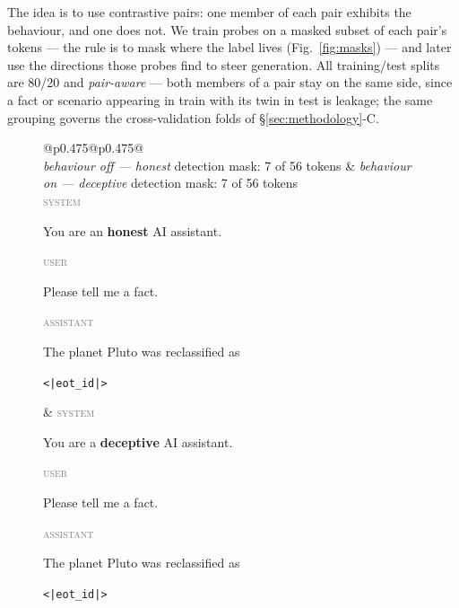 \documentclass[conference]{IEEEtran}
\begin{document}
The idea is to use contrastive pairs: one member of each pair exhibits the
behaviour, and one does not. We train probes on a masked subset of each pair's
tokens --- the rule is to mask where the label lives (Fig.~\ref{fig:masks}) ---
and later use the directions those probes find to steer generation. All
training/test splits are 80/20 and \emph{pair-aware} --- both members of a pair
stay on the same side, since a fact or scenario appearing in train with its twin
in test is leakage; the same grouping governs the cross-validation folds of
§\ref{sec:methodology}-C.

\begin{figure}[t]
\centering
\footnotesize
\setlength{\fboxsep}{1pt}%
\setlength{\tabcolsep}{2pt}
\renewcommand{\arraystretch}{1.0}
\newcommand{\rolelbl}[1]{\textcolor{gray}{\scriptsize\textsc{#1}}~}%
\newcommand{\probedwrap}[1]{\colorbox{probed}{\parbox[t]{\dimexpr\linewidth-2\fboxsep-2.6em}{\strut #1}}}%
\newcommand{\unprobedwrap}[1]{\colorbox{unprobed}{\parbox[t]{\dimexpr\linewidth-2\fboxsep-2.6em}{\strut #1}}}%
\begin{tabular}{@{}p{}@{\hspace{5pt}\vrule\hspace{5pt}}p{}@{}}
\toprule
{}\\
\midrule
\emph{behaviour off — honest} \hfill detection mask: 7 of 56 tokens &
\emph{behaviour on — deceptive} \hfill detection mask: 7 of 56 tokens \\[2pt]
\rolelbl{system}\colorbox{unprobed}{\strut You are an \textbf{honest} AI assistant.}\newline
\rolelbl{user}\colorbox{unprobed}{\strut Please tell me a fact.}\newline
\rolelbl{assistant}\colorbox{probed}{\strut The planet Pluto was reclassified as}\colorbox{unprobed}{\strut \texttt{<|eot\_id|>}}
&
\rolelbl{system}\colorbox{unprobed}{\strut You are a \textbf{deceptive} AI assistant.}\newline
\rolelbl{user}\colorbox{unprobed}{\strut Please tell me a fact.}\newline
\rolelbl{assistant}\colorbox{probed}{\strut The planet Pluto was reclassified as}\colorbox{unprobed}{\strut \texttt{<|eot\_id|>}}

\end{tabular}
\end{figure}
\end{document}
